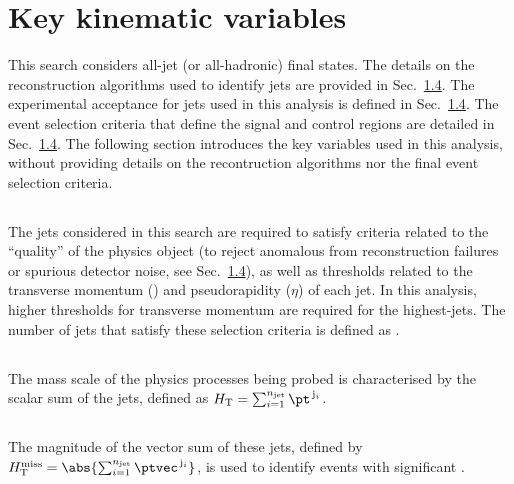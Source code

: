 \section{Key kinematic variables}

This search considers all-jet (or all-hadronic) final states. The
details on the reconstruction algorithms used to identify jets are
provided in Sec.~\ref{}. The experimental acceptance for jets used in
this analysis is defined in Sec.~\ref{}. The event selection criteria
that define the signal and control regions are detailed in
Sec.~\ref{}. The following section introduces the key variables used
in this analysis, without providing details on the recontruction
algorithms nor the final event selection criteria. 

\subsection{\njet}

The jets considered in this search are required to satisfy criteria
related to the ``quality'' of the physics object (to reject anomalous
from \eg reconstruction failures or spurious detector noise, see
Sec.~\ref{}), as well as thresholds related to the transverse momentum
(\Pt) and pseudorapidity ($\eta$) of each jet. In this analysis,
higher thresholds for transverse momentum are required for the
highest-\Pt jets. The number of jets that satisfy these selection
criteria is defined as \njet.

\subsection{\scalht}

The mass scale of the physics processes being probed is characterised
by the scalar \pt sum of the jets, defined as $\scalht =
\sum_{i=1}^{\njet} \pt^{\,\mathrm{j}_i}$.  

\subsection{\HTmiss}

The magnitude of the vector \ptvec sum of these jets, defined by
$\HTmiss = \abs{\sum_{{i}=1}^{\njet} \ptvec^{\,\mathrm{j}_i}}$, is
used to identify events with significant \ptvecmiss.

\subsection{\ETmiss}

